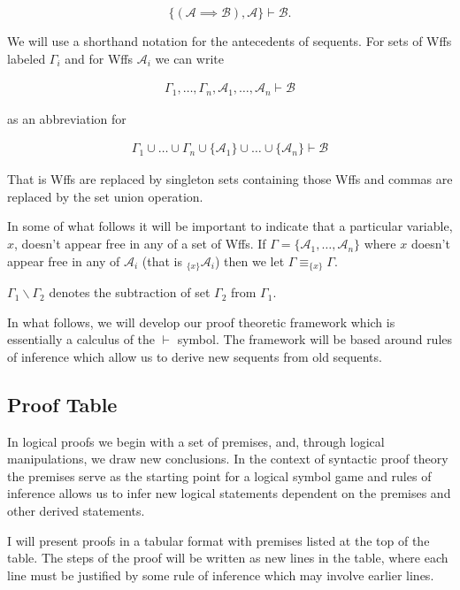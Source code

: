\documentclass[12pt]{article}
\newcommand{\mc}[1]{\mathcal{#1}}
\begin{document}
$$
\{(\mc{A}\implies \mc{B}), \mc{A}\} \vdash \mc{B}.
$$

We will use a shorthand notation for the antecedents of sequents.
For sets of Wffs labeled $\Gamma_i$ and for Wffs $\mc{A}_i$ we can write

\begin{align}
\Gamma_1, \ldots, \Gamma_n, \mc{A}_1, \ldots, \mc{A}_n \vdash \mc{B}
\end{align}

as an abbreviation for

\begin{align}
\Gamma_1 \cup \ldots \cup \Gamma_n \cup \{\mc{A}_1\} \cup \ldots \cup \{\mc{A}_n\} \vdash \mc{B}
\end{align}

That is Wffs are replaced by singleton sets containing those Wffs and commas are replaced by the set union operation.

In some of what follows it will be important to indicate that a particular variable, $x$, doesn't appear free in any of a set of Wffs. If $\Gamma = \{\mc{A}_1, \ldots , \mc{A}_n\}$ where $x$ doesn't appear free in any of $\mc{A}_i$ (that is $_{\{x\}}\mc{A}_i$) then we let $\Gamma \equiv _{\{x\}}\Gamma$.

$\Gamma_1 \backslash \Gamma_2$ denotes the subtraction of set $\Gamma_2$ from $\Gamma_1$.

In what follows, we will develop our proof theoretic framework which is essentially a calculus of the $\vdash$ symbol.
The framework will be based around rules of inference which allow us to derive new sequents from old sequents.

\subsection*{Proof Table}

In logical proofs we begin with a set of premises, and, through logical manipulations, we draw new conclusions.
In the context of syntactic proof theory the premises serve as the starting point for a logical symbol game and rules of inference allows us to infer new logical statements dependent on the premises and other derived statements.

I will present proofs in a tabular format with premises listed at the top of the table.
The steps of the proof will be written as new lines in the table, where each line must be justified by some rule of inference which may involve earlier lines. 
\end{document}
